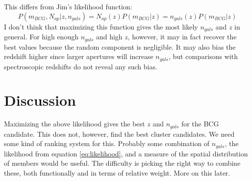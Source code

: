 \documentclass[preprint]{aastex}
\begin{document}
This differs from Jim's likelihood function:
\begin{equation}
P(m_{BCG}, N_{ap} | z, n_{gals}) = N_{ap}(z)P(m_{BCG}|z) = 
        n_{gals}(z)P(m_{BCG}|z)
\end{equation}
I don't think that maximizing this function gives the most likely $n_{gals}$
and $z$ in general.  For high enough $n_{gals}$ and high $z$, however, it may
in fact recover the best values because the random component is negligible.  It
may also bias the redshift higher since larger apertures will increase
$n_{gals}$, but comparisons with spectroscopic redshifts do not reveal any such
bias.

\section{Discussion}

Maximizing the above likelihood gives the best $z$ and $n_{gals}$ for the 
BCG candidate.  This does not, however, find the best cluster candidates.
We need some kind of ranking system for this.  Probably some combination
of $n_{gals}$, the likelihood from equation \ref{eq:likelihood}, and a 
measure of the spatial distribution of members would be useful.  The difficulty
is picking the right way to combine these, both functionally and in terms
of relative weight.  More on this later.
\end{document}
